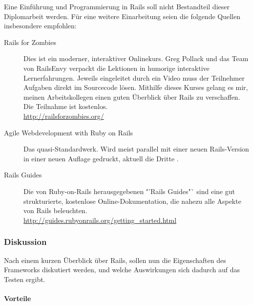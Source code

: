 Eine Einführung und Programmierung in Rails soll nicht Bestandteil dieser Diplomarbeit werden. Für eine weitere Einarbeitung seien die folgende Quellen insbesondere empfohlen:
\begin{description}
 \item[Rails for Zombies] Dies ist ein moderner, interaktiver Onlinekurs. Greg Pollack und das Team von RailsEnvy verpackt die Lektionen in humorige interaktive Lernerfahrungen. Jeweils eingeleitet durch ein Video muss der Teilnehmer Aufgaben direkt im Sourcecode lösen. Mithilfe dieses Kurses gelang es mir, meinen Arbeitskollegen einen guten Überblick über Rails zu verschaffen. Die Teilnahme ist kostenlos.\\
 \url{http://railsforzombies.org/}
 \item[Agile Webdevelopment with Ruby on Rails] Das quasi-Standardwerk. Wird meist parallel mit einer neuen Rails-Version in einer neuen Auflage gedruckt, aktuell die Dritte \citep{ruby_agile_2009}.
 \item[Rails Guides] Die von Ruby-on-Rails herausgegebenen "'Rails Guides"` sind eine gut strukturierte, kostenlose Online-Dokumentation, die nahezu alle Aspekte von Rails beleuchten.\\
 \url{http://guides.rubyonrails.org/getting_started.html}
 \end{description}



\subsubsection{Diskussion}
Nach einem kurzen Überblick über Rails, sollen nun die Eigenschaften des Frameworks diskutiert werden, und welche Auswirkungen sich dadurch auf das Testen ergibt.
\paragraph{Vorteile}


